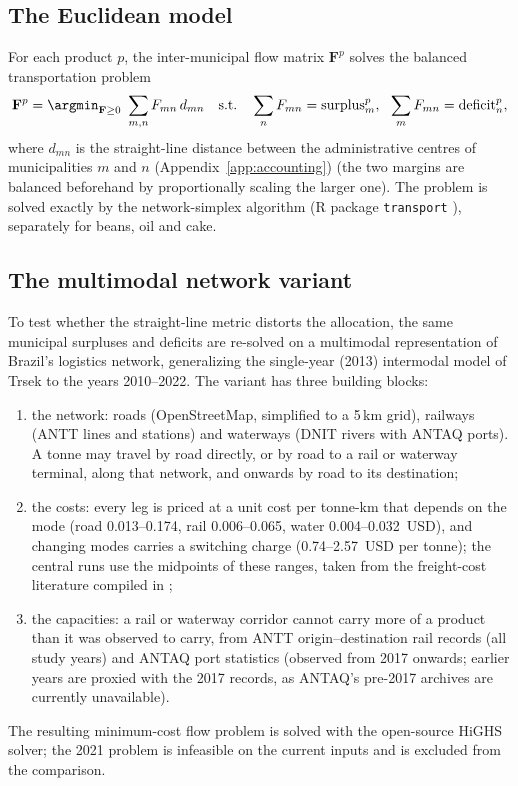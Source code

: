 \subsection{The Euclidean model}\label{subsubsec:euclid}
For each product
$p$, the inter-municipal flow matrix $\mathbf{F}^p$ solves the balanced
transportation problem
\begin{equation}\label{eq:ot}
  \mathbf{F}^{p}=\argmin_{\mathbf{F}\ge0}\ \sum_{m,n}F_{mn}\,d_{mn}
  \quad\text{s.t.}\quad
  \sum_{n}F_{mn}=\text{surplus}^p_m,\ \
  \sum_{m}F_{mn}=\text{deficit}^p_n,
\end{equation}
where $d_{mn}$ is the straight-line distance between the administrative
centres of municipalities $m$ and $n$ (Appendix~\ref{app:accounting}) (the two margins are balanced beforehand by
proportionally scaling the larger one). The problem is solved exactly by
the network-simplex algorithm (R package \texttt{transport}
\cite{schuhmacher2023transport}), separately for beans, oil and cake.

\subsection{The multimodal network variant}\label{subsubsec:multimode}
To test whether the straight-line metric distorts the allocation, the
same municipal surpluses and deficits are re-solved on a multimodal
representation of Brazil's logistics network, generalizing the
single-year (2013) intermodal model of Trsek \cite{trsek2022} to the
years 2010--2022. The variant has three building blocks:
\begin{enumerate}
\item the network: roads (OpenStreetMap, simplified to a 5\,km grid),
railways (ANTT lines and stations) and waterways (DNIT rivers with
ANTAQ ports). A tonne may travel by road directly, or by road to a
rail or waterway terminal, along that network, and onwards by road to
its destination;
\item the costs: every leg is priced at a unit cost per tonne-km that
depends on the mode (road 0.013--0.174, rail 0.006--0.065, water
0.004--0.032~USD), and changing modes carries a switching charge
(0.74--2.57~USD per tonne); the central runs use the midpoints of
these ranges, taken from the freight-cost literature compiled in
\cite{trsek2022};
\item the capacities: a rail or waterway corridor cannot carry more of
a product than it was observed to carry, from ANTT
origin--destination rail records (all study years) and ANTAQ port
statistics (observed from 2017 onwards; earlier years are proxied with
the 2017 records, as ANTAQ's pre-2017 archives are currently
unavailable).
\end{enumerate}
The resulting minimum-cost flow problem is solved with the open-source
HiGHS solver; the 2021 problem is infeasible on the current inputs and
is excluded from the comparison.

